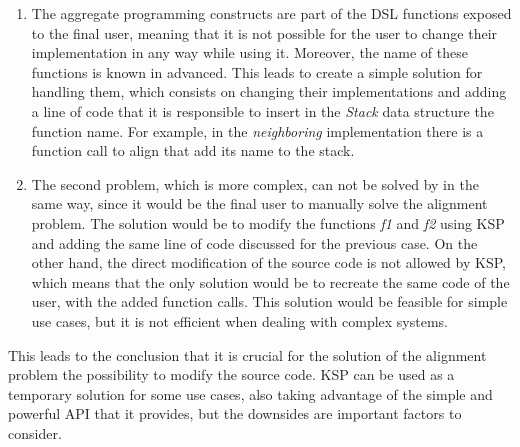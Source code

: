 \begin{enumerate}
    \item The aggregate programming constructs are part of the DSL functions exposed to the final user, meaning that it is not possible for the user to change their implementation in any way while using it. Moreover, the name of these functions is known in advanced. This leads to create a simple solution for handling them, which consists on changing their implementations and adding a line of code that it is responsible to insert in the \textit{Stack} data structure the function name. For example, in the \textit{neighboring} implementation there is a function call to align that add its name to the stack.
    \item The second problem, which is more complex, can not be solved by in the same way, since it would be the final user to manually solve the alignment problem. The solution would be to modify the functions \textit{f1} and \textit{f2} using KSP and adding the same line of code discussed for the previous case. On the other hand, the direct modification of the source code is not allowed by KSP, which means that the only solution would be to recreate the same code of the user, with the added function calls. This solution would be feasible for simple use cases, but it is not efficient when dealing with complex systems.
\end{enumerate}
This leads to the conclusion that it is crucial for the solution of the alignment problem the possibility to modify the source code. KSP can be used as a temporary solution for some use cases, also taking advantage of the simple and powerful API that it provides, but the downsides are important factors to consider.

